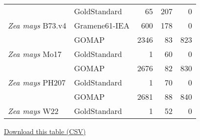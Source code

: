 \documentclass[utf8]{frontiersSCNS}
\begin{document}
\begin{table}[t]
{\begin{threeparttable}
\begin{tabular}{llrrr}
\rowcolor{gray!6}   & GoldStandard & 65 & 207 & 0\\

\multirow{-3}{*}{\raggedright\arraybackslash \textit{Zea mays} B73.v4} & Gramene61-IEA & 600 & 178 & 0\\
\cmidrule{1-5}
\rowcolor{gray!6}   & GOMAP & 2346 & 83 & 823\\

\multirow{-2}{*}{\raggedright\arraybackslash \textit{Zea mays} Mo17} & GoldStandard & 1 & 60 & 0\\
\cmidrule{1-5}
\rowcolor{gray!6}   & GOMAP & 2676 & 82 & 830\\

\multirow{-2}{*}{\raggedright\arraybackslash \textit{Zea mays} PH207} & GoldStandard & 1 & 70 & 0\\
\cmidrule{1-5}
\rowcolor{gray!6}   & GOMAP & 2681 & 88 & 840\\

\multirow{-2}{*}{\raggedright\arraybackslash \textit{Zea mays} W22} & GoldStandard & 1 & 52 & 0\\
\bottomrule
\end{tabular}
\begin{tablenotes}
\item \href{https://raw.githubusercontent.com/Dill-PICL/GOMAP-Paper-2019.1/master/analyses/cleanup/results/cleanup_table.csv}{Download this table (CSV)}
\end{tablenotes}
\end{threeparttable}}
\end{table}
\end{document}
